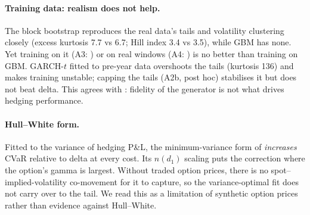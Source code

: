 \paragraph{Training data: realism does not help.} The block bootstrap reproduces the real data's tails
and volatility clustering closely (excess kurtosis 7.7 vs 6.7; Hill index 3.4 vs 3.5), while GBM has
none. Yet training on it (A3: \DiffAThreeFocus{}) or on real windows (A4: \DiffAFourFocus{}) is no better
than training on GBM. GARCH-$t$ fitted to pre-year data overshoots the tails (kurtosis 136) and makes
training unstable; capping the tails (A2b, post hoc) stabilises it but does not beat delta. This agrees
with \citet{hashimoto2026realism}: fidelity of the generator is not what drives hedging performance.

\paragraph{Hull--White form.} Fitted to the variance of hedging P\&L, the minimum-variance form
of \citet{hull2017optimal} \emph{increases} CVaR relative to delta at every cost. Its $n(d_1)$ scaling
puts the correction where the option's gamma is largest. Without traded option prices, there is no
spot--implied-volatility co-movement for it to capture, so the variance-optimal fit does not carry over
to the tail. We read this as a limitation of synthetic option prices rather than evidence against Hull--White.
